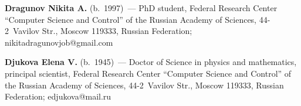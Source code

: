 \Contr

\noindent
\textbf{Dragunov Nikita A.} (b.\ 1997)~--- 
PhD student, Federal Research Center ``Computer Science and Control'' 
of the Russian Academy of Sciences, 44-2~Vavilov Str., Moscow 119333, Russian Federation; 
\mbox{nikitadragunovjob@gmail.com}

\vspace*{3pt}

\noindent
\textbf{Djukova Elena V.} (b.\ 1945)~--- 
Doctor of Science in physics and mathematics, principal scientist, Federal Research Center
``Computer Science and Control'' of the Russian Academy of Sciences, 44-2~Vavilov Str., Moscow 119333, 
Russian Federation; \mbox{edjukova@mail.ru}




\label{end\stat}

\renewcommand{\bibname}{\protect\rm Литература} 
